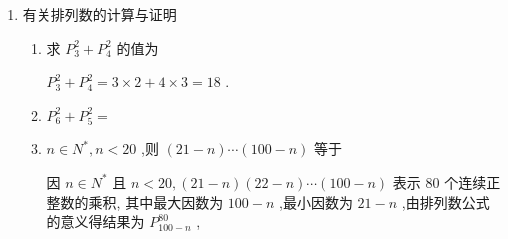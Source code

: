 \begin{enumerate}
\begin{enumerate}
\begin{jieda}
\begin{enumerate}
                第二步，对甲、乙、丙进行全排列. 由乘法原理得 $P_{7}^{7} = {N} \times  P_{3}^{3}$ ,
                
                所以 $N = \dfrac{P_{7}^{2}}{P_{3}^{3}} = {840}$ (种)
                
                \item 位置分析法. 先排最左边，除去甲外有 $P_{6}^{1}$ 种排法，余下的 6 个位置全排有 $P_{6}^{6}$ 种排法， 但应剔除乙在最右边的排法 $P_{5}^{1}P_{5}^{5}$ 种，则符合条件的排法共有 $P_{6}^{1}P_{6}^{6} - P_{5}^{1}P_{5}^{5} = {3720}$ (种).
            \end{enumerate}
        \end{jieda}
    \end{enumerate}

    
    \item 有关排列数的计算与证明
    \begin{enumerate}
        \item 求 $P_{3}^{2} + P_{4}^{2}$ 的值为
        \begin{jieda}
            $P_{3}^{2} + P_{4}^{2} = 3 \times  2 + 4 \times  3 = {18}$ .
        \end{jieda}
        \item $P_{6}^{2} + P_{5}^{2} =$
        \item $n \in  {{N}}^{ * },n < {20}$ ,则 $\left( {{21} - n}\right) \cdots \left( {{100} - n}\right)$ 等于
        \begin{jieda}
            因 $n \in  {{N}}^{ * }$ 且 $n < {20},\left( {{21} - n}\right) \left( {{22} - n}\right) \cdots \left( {{100} - n}\right)$ 表示 80 个连续正整数的乘积, 其中最大因数为 ${100} - n$ ,最小因数为 ${21} - n$ ,由排列数公式的意义得结果为 $P_{{100} - n}^{80}$ ,
            

\end{jieda}
\end{enumerate}
\end{enumerate}
